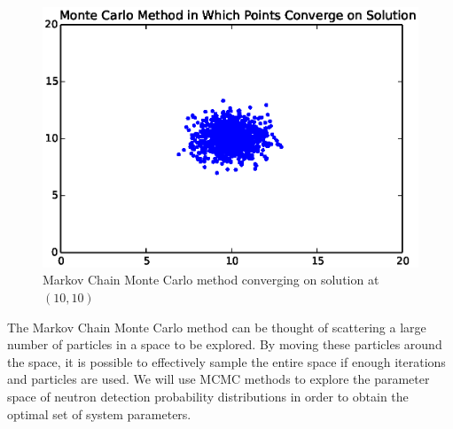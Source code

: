 \begin{figure}[ht!]
\centering
\includegraphics[scale=1.0]{Figures/mcmc.eps}
\caption{Markov Chain Monte Carlo method converging on solution at $(10,10)$}
\label{fig:mcmc}
\end{figure}
The Markov Chain Monte Carlo method can be thought of scattering a large number of particles in a space to be explored. By moving these particles around the space, it is possible to effectively sample the entire space if enough iterations and particles are used. We will use MCMC methods to explore the parameter space of neutron detection probability distributions in order to obtain the optimal set of system parameters. 
